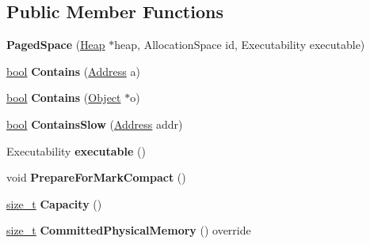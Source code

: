 \subsection*{Public Member Functions}
\begin{DoxyCompactItemize}
\item 
\mbox{\label{classv8_1_1internal_1_1PagedSpace_a6440528a56d355adf4767b78ea110d09}} 
{\bfseries Paged\+Space} (\mbox{\hyperlink{classv8_1_1internal_1_1Heap}{Heap}} $\ast$heap, Allocation\+Space id, Executability executable)
\item 
\mbox{\label{classv8_1_1internal_1_1PagedSpace_a036e435d35992934e04555cafc9862f3}} 
\mbox{\hyperlink{classbool}{bool}} {\bfseries Contains} (\mbox{\hyperlink{classuintptr__t}{Address}} a)
\item 
\mbox{\label{classv8_1_1internal_1_1PagedSpace_a44185c0be4d9a8399df8f4fa93567e45}} 
\mbox{\hyperlink{classbool}{bool}} {\bfseries Contains} (\mbox{\hyperlink{classv8_1_1internal_1_1Object}{Object}} $\ast$o)
\item 
\mbox{\label{classv8_1_1internal_1_1PagedSpace_a794549ba01a528900a103d7edc5a3abe}} 
\mbox{\hyperlink{classbool}{bool}} {\bfseries Contains\+Slow} (\mbox{\hyperlink{classuintptr__t}{Address}} addr)
\item 
\mbox{\label{classv8_1_1internal_1_1PagedSpace_ab90d70b6b22f54ca07b2c1352b17d76e}} 
Executability {\bfseries executable} ()
\item 
\mbox{\label{classv8_1_1internal_1_1PagedSpace_a89fdc3ca159cf2f174fe1d4750af1fd0}} 
void {\bfseries Prepare\+For\+Mark\+Compact} ()
\item 
\mbox{\label{classv8_1_1internal_1_1PagedSpace_aff4aed73693e367ee5edeadd19871439}} 
\mbox{\hyperlink{classsize__t}{size\+\_\+t}} {\bfseries Capacity} ()
\item 
\mbox{\label{classv8_1_1internal_1_1PagedSpace_a301c9ae946ef646107499ca03c8cbf07}} 
\mbox{\hyperlink{classsize__t}{size\+\_\+t}} {\bfseries Committed\+Physical\+Memory} () override

\end{DoxyCompactItemize}
